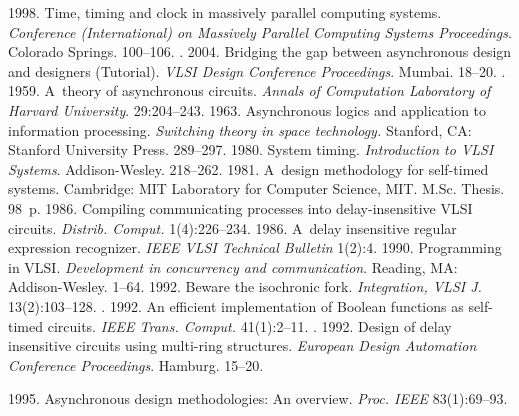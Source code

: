   \begin{multicols}{2}

\renewcommand{\bibname}{\protect\rmfamily References}

{\small\frenchspacing
{%
\begin{thebibliography}{99}
1998. Time, timing and clock in massively parallel computing systems. 
\textit{Conference (International) on Massively Parallel Computing Systems Proceedings}.
Colorado Springs. 100--106.
. 
2004. Bridging the gap between asynchronous design and designers (Tutorial). 
\textit{VLSI Design Conference Proceedings}. Mumbai. 18--20.
. 1959. 
A~theory of asynchronous circuits. \textit{Annals of Computation Laboratory of Harvard University}.
29:204--243.
 1963. 
Asynchronous logics and application to information processing.  
\textit{Switching theory in space technology.} 
Stanford, CA: Stanford University Press. 289--297.
 1980. System timing. 
\textit{Introduction to VLSI Systems}. Addison-Wesley. 218--262.
 1981. A~design methodology for self-timed systems. 
Cambridge: MIT Laboratory for Computer Science, MIT. M.Sc. Thesis.  98~p.
 1986. Compiling communicating processes into delay-insensitive 
VLSI circuits. \textit{Distrib. Comput.} 1(4):226--234.
 1986. A~delay insensitive regular expression recognizer. 
\textit{IEEE VLSI Technical Bulletin} 1(2):4. 
 1990. Programming in VLSI. 
\textit{Development in concurrency and communication}. Reading, MA: Addison-Wesley. 1--64.
 1992. Beware the isochronic fork. 
\textit{Integration, VLSI J.} 13(2):103--128.
. 1992. 
An efficient implementation of Boolean functions as self-timed circuits. 
\textit{IEEE Trans. Comput.} 41(1):2--11.
. 1992. 
Design of delay insensitive circuits using multi-ring structures. 
\textit{European Design Automation Conference Proceedings}. Hamburg. 15--20.

 1995. Asynchronous design methodologies: An overview. 
\textit{Proc. IEEE} 83(1):69--93.


\end{thebibliography}}}
\end{multicols}
